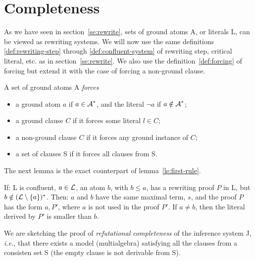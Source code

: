 \section{Completeness} \label{se:completenessNG} 
%
As we have seen in section~\ref{se:rewrite}, sets of ground atoms \C A, or literals
\C L, can be viewed as rewriting systems. We will now use
the same definitions \ref{def:rewriting-step} through \ref{def:confluent-system}
of rewriting step, critical literal, etc. as in
section~\ref{se:rewrite}. We also use the definition~\ref{def:forcing} of forcing
but extend it with the case of forcing a non-ground clause.
\begin{DEFINITION}\label{def:ground-rewriting}\label {def:forcingNG}
A set of ground atoms \C A {\em forces}
\begin{itemize}\MyLPar%
\item a ground atom  $a$ if \(a\in\mbox {$\cal A$}^\ast\), and the literal \(\neg a\) if 
\(a\notin \mbox {$\cal A$}^\ast\);
\item a ground clause $C$ if it forces some literal \(l\in C\);
\item a non-ground clause $C$ if it forces any ground instance of $C$;
\item a set of clauses \C S if it forces all clauses from \C S.
\end{itemize}
 \end{DEFINITION}
%
The next lemma is the exact counterpart of lemma~\ref{le:first-rule}.
 \begin{LEMMA} \label {le:first-ruleNG} 
If: \C L is confluent, \(a\in \mbox {$\cal L$}\), an atom $b$, with \(b\leq a\), has a
rewriting proof $P$ in \C L, but \(b\notin(\mbox {$\cal L$}\setminus \{a\})^\ast\).  Then:
$a$ and $b$ have the same maximal term, $s$, and the proof $P$ has the
form $a,P'$, where $a$ is not used in the proof $P'$. If \(a\ne b\), then the
literal derived by $P'$ is smaller than $b$.
 \end{LEMMA}
%
We are sketching the proof of {\em refutational completeness} of the inference system
\C J, {\em i.e.}, that there exists a model (multialgebra) satisfying all the
clauses from a consisten set \C S (the empty clause is not derivable from \C S). 

